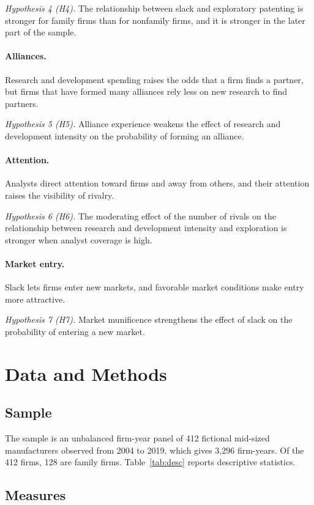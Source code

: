 \documentclass[11pt]{article}
\begin{document}
\emph{Hypothesis 4 (H4).} The relationship between slack and exploratory patenting is stronger for family firms than for nonfamily firms, and it is stronger in the later part of the sample.

\paragraph{Alliances.} Research and development spending raises the odds that a firm finds a partner, but firms that have formed many alliances rely less on new research to find partners.

\emph{Hypothesis 5 (H5).} Alliance experience weakens the effect of research and development intensity on the probability of forming an alliance.

\paragraph{Attention.} Analysts direct attention toward firms and away from others, and their attention raises the visibility of rivalry.

\emph{Hypothesis 6 (H6).} The moderating effect of the number of rivals on the relationship between research and development intensity and exploration is stronger when analyst coverage is high.

\paragraph{Market entry.} Slack lets firms enter new markets, and favorable market conditions make entry more attractive.

\emph{Hypothesis 7 (H7).} Market munificence strengthens the effect of slack on the probability of entering a new market.

\section{Data and Methods}

\subsection{Sample}

The sample is an unbalanced firm-year panel of 412 fictional mid-sized manufacturers observed from 2004 to 2019, which gives 3,296 firm-years. Of the 412 firms, 128 are family firms. Table~\ref{tab:desc} reports descriptive statistics.

\subsection{Measures}
\end{document}
